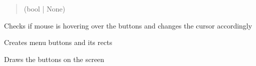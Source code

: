\documentclass[letterpaper,10pt,english]{sphinxmanual}
\begin{document}
\begin{fulllineitems}
\begin{fulllineitems}
\begin{quote}
\begin{description}
\sphinxAtStartPar
(bool | None)

\end{description}\end{quote}

\end{fulllineitems}


\begin{fulllineitems}
\label{\detokenize{tetris.menu:tetris.menu.Menu.check_hover}}
\pysigstartsignatures
{}
\pysigstopsignatures
\sphinxAtStartPar
Checks if mouse is hovering over the buttons and changes the cursor accordingly

\end{fulllineitems}


\begin{fulllineitems}
\label{\detokenize{tetris.menu:tetris.menu.Menu.choice}}
\pysigstartsignatures
{}
\pysigstopsignatures
\end{fulllineitems}


\begin{fulllineitems}
\label{\detokenize{tetris.menu:tetris.menu.Menu.create_buttons}}
\pysigstartsignatures
{}
\pysigstopsignatures
\sphinxAtStartPar
Creates menu buttons and its rects

\end{fulllineitems}


\begin{fulllineitems}
\label{\detokenize{tetris.menu:tetris.menu.Menu.draw_buttons}}
\pysigstartsignatures
{}
\pysigstopsignatures
\sphinxAtStartPar
Draws the buttons on the screen


\end{fulllineitems}
\end{fulllineitems}
\end{document}
